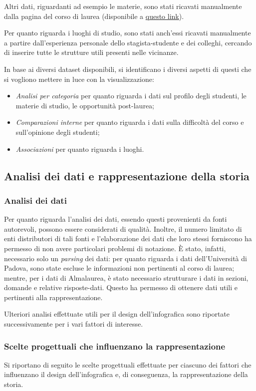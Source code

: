 Altri dati, riguardanti ad esempio le materie, sono stati ricavati manualmente dalla pagina del corso di laurea (disponibile a \href{https://www.didattica.unipd.it/off/2023/LT/SC/SC1167}{questo link}).

Per quanto riguarda i luoghi di studio, sono stati anch'essi ricavati manualmente a partire dall'esperienza personale dello stagista-studente e dei colleghi, cercando di inserire tutte le strutture utili presenti nelle vicinanze.

\bigskip
\noindent In base ai diversi dataset disponibili, si identificano i diversi aspetti di questi che si vogliono mettere in luce con la visualizzazione:
\begin{itemize}
    \item \emph{Analisi per categoria} per quanto riguarda i dati sul profilo degli studenti, le materie di studio, le opportunità post-laurea;
    \item \emph{Comparazioni interne} per quanto riguarda i dati sulla difficoltà del corso e sull'opinione degli studenti;
    \item \emph{Associazioni} per quanto riguarda i luoghi.
\end{itemize}

\subsection{Analisi dei dati e rappresentazione della storia}
\subsubsection{Analisi dei dati}
Per quanto riguarda l'analisi dei dati, essendo questi provenienti da fonti autorevoli, possono essere considerati di qualità. Inoltre, il numero limitato di enti distributori di tali fonti e l'elaborazione 
dei dati che loro stessi forniscono ha permesso di non avere particolari problemi di notazione. 
È stato, infatti, necessario solo un \emph{parsing} dei dati: per quanto riguarda i dati dell'Università di Padova, sono state escluse le informazioni non pertinenti al corso di laurea;
mentre, per i dati di Almalaurea, è stato necessario strutturare i dati in sezioni, domande e relative risposte-dati. 
Questo ha permesso di ottenere dati utili e pertinenti alla rappresentazione.

Ulteriori analisi effettuate utili per il design dell'infografica sono riportate successivamente per i vari fattori di interesse.

\subsubsection{Scelte progettuali che influenzano la rappresentazione}
Si riportano di seguito le scelte progettuali effettuate per ciascuno dei fattori che influenzano il design dell'infografica
e, di conseguenza, la rappresentazione della storia.

